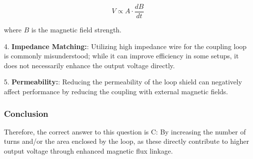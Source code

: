    \[
   V \propto A \cdot \frac{dB}{dt}
   \]

   where \(B\) is the magnetic field strength.

4. \textbf{Impedance Matching:}: Utilizing high impedance wire for the coupling loop is commonly misunderstood; while it can improve efficiency in some setups, it does not necessarily enhance the output voltage directly.

5. \textbf{Permeability:}: Reducing the permeability of the loop shield can negatively affect performance by reducing the coupling with external magnetic fields.

\subsubsection*{Conclusion}

Therefore, the correct answer to this question is C: By increasing the number of turns and/or the area enclosed by the loop, as these directly contribute to higher output voltage through enhanced magnetic flux linkage.

\begin{center}
\end{center}
